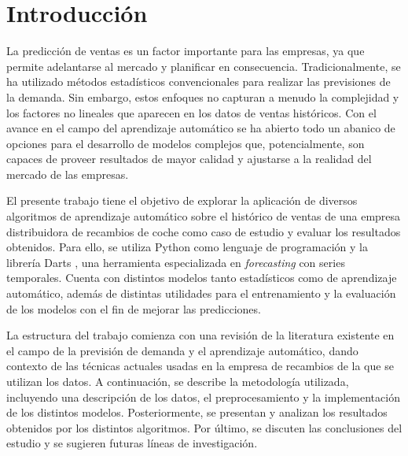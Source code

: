 \chapter{Introducción}\label{cap1}

La predicción de ventas es un factor importante para las empresas, ya que permite adelantarse al mercado y planificar en consecuencia. Tradicionalmente, se ha utilizado métodos estadísticos convencionales para realizar las previsiones de la demanda. Sin embargo, estos enfoques no capturan a menudo la complejidad y los factores no lineales que aparecen en los datos de ventas históricos. Con el avance en el campo del aprendizaje automático se ha abierto todo un abanico de opciones para el desarrollo de modelos complejos que, potencialmente, son capaces de proveer resultados de mayor calidad y ajustarse a la realidad del mercado de las empresas.

El presente trabajo tiene el objetivo de explorar la aplicación de diversos algoritmos de aprendizaje automático sobre el histórico de ventas de una empresa distribuidora de recambios de coche como caso de estudio y evaluar los resultados obtenidos. Para ello, se utiliza Python \cite*{python} como lenguaje de programación y la librería Darts \cite*{darts}, una herramienta especializada en \textit{forecasting} con series temporales. Cuenta con distintos modelos tanto estadísticos como de aprendizaje automático, además de distintas utilidades para el entrenamiento y la evaluación de los modelos con el fin de mejorar las predicciones.

La estructura del trabajo comienza con una revisión de la literatura existente en el campo de la previsión de demanda y el aprendizaje automático, dando contexto de las técnicas actuales usadas en la empresa de recambios de la que se utilizan los datos. A continuación, se describe la metodología utilizada, incluyendo una descripción de los datos, el preprocesamiento y la implementación de los distintos modelos. Posteriormente, se presentan y analizan los resultados obtenidos por los distintos algoritmos. Por último, se discuten las conclusiones del estudio y se sugieren futuras líneas de investigación.







